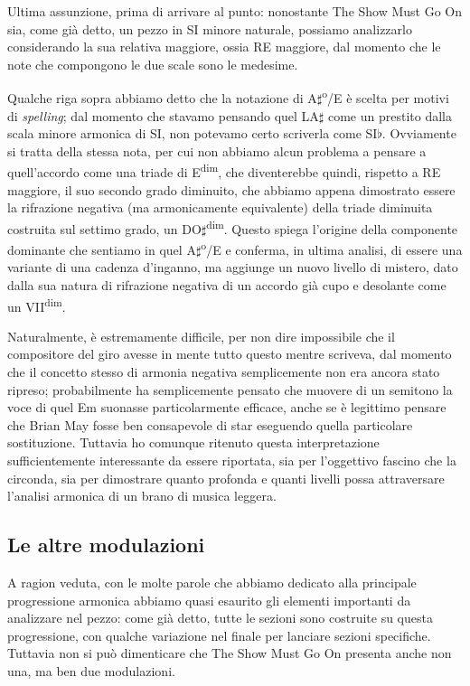 \documentclass[12pt]{article}
\begin{document}
Ultima assunzione, prima di arrivare al punto: nonostante The Show Must Go On sia, come già detto, un pezzo in SI minore naturale, possiamo analizzarlo considerando la sua relativa maggiore, ossia RE maggiore, dal momento che le note che compongono le due scale sono le medesime.

Qualche riga sopra abbiamo detto che la notazione di A\(\sharp\)\textsuperscript{o}/E è scelta per motivi di \emph{spelling}; dal momento che stavamo pensando quel LA\(\sharp\) come un prestito dalla scala minore armonica di SI, non potevamo certo scriverla come SI\(\flat\). Ovviamente si tratta della stessa nota, per cui non abbiamo alcun problema a pensare a quell'accordo come una triade di E\textsuperscript{dim}, che diventerebbe quindi, rispetto a RE maggiore, il suo secondo grado diminuito, che abbiamo appena dimostrato essere la rifrazione negativa (ma armonicamente equivalente) della triade diminuita costruita sul settimo grado, un DO\(\sharp\)\textsuperscript{dim}. Questo spiega l'origine della componente dominante che sentiamo in quel A\(\sharp\)\textsuperscript{o}/E e conferma, in ultima analisi, di essere una variante di una cadenza d'inganno, ma aggiunge un nuovo livello di mistero, dato dalla sua natura di rifrazione negativa di un accordo già cupo e desolante come un VII\textsuperscript{dim}.

Naturalmente, è estremamente difficile, per non dire impossibile che il compositore del giro avesse in mente tutto questo mentre scriveva, dal momento che il concetto stesso di armonia negativa semplicemente non era ancora stato ripreso; probabilmente ha semplicemente pensato che muovere di un semitono la voce di quel Em suonasse particolarmente efficace, anche se è legittimo pensare che Brian May fosse ben consapevole di star eseguendo quella particolare sostituzione. Tuttavia ho comunque ritenuto questa interpretazione sufficientemente interessante da essere riportata, sia per l'oggettivo fascino che la circonda, sia per dimostrare quanto profonda e quanti livelli possa attraversare l'analisi armonica di un brano di musica leggera.

\subsection{Le altre modulazioni}
A ragion veduta, con le molte parole che abbiamo dedicato alla principale progressione armonica abbiamo quasi esaurito gli elementi importanti da analizzare nel pezzo: come già detto, tutte le sezioni sono costruite su questa progressione, con qualche variazione nel finale per lanciare sezioni specifiche. Tuttavia non si può dimenticare che The Show Must Go On presenta anche non una, ma ben due modulazioni.
\end{document}

